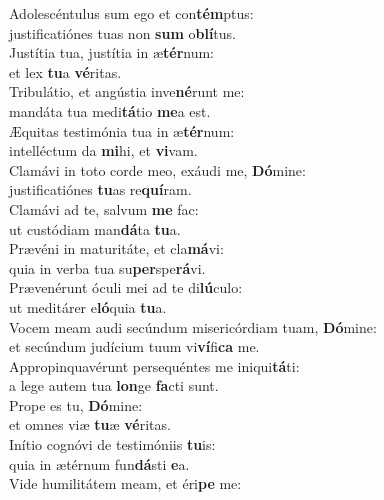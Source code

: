 \oddverse Adolescéntulus sum ego et con\textbf{tém}ptus:~\*\\
\oddverse justificatiónes tuas non \textbf{sum} o\textbf{blí}tus.\\
\evenverse Justítia tua, justítia in æ\textbf{tér}num:~\*\\
\evenverse et lex \textbf{tu}a \textbf{vé}ritas.\\
\oddverse Tribulátio, et angústia inve\textbf{né}runt me:~\*\\
\oddverse mandáta tua medi\textbf{tá}tio \textbf{me}a est.\\
\evenverse Æquitas testimónia tua in æ\textbf{tér}num:~\*\\
\evenverse intelléctum da \textbf{mi}hi, et \textbf{vi}vam.\\
\oddverse Clamávi in toto corde meo, exáudi me, \textbf{Dó}mine:~\*\\
\oddverse justificatiónes \textbf{tu}as re\textbf{quí}ram.\\
\evenverse Clamávi ad te, salvum \textbf{me} fac:~\*\\
\evenverse ut custódiam man\textbf{dá}ta \textbf{tu}a.\\
\oddverse Prævéni in maturitáte, et cla\textbf{má}vi:~\*\\
\oddverse quia in verba tua su\textbf{per}spe\textbf{rá}vi.\\
\evenverse Prævenérunt óculi mei ad te di\textbf{lú}culo:~\*\\
\evenverse ut meditárer e\textbf{ló}quia \textbf{tu}a.\\
\oddverse Vocem meam audi secúndum misericórdiam tuam, \textbf{Dó}mine:~\*\\
\oddverse et secúndum judícium tuum vi\textbf{ví}fi\textbf{ca} me.\\
\evenverse Appropinquavérunt persequéntes me iniqui\textbf{tá}ti:~\*\\
\evenverse a lege autem tua \textbf{lon}ge \textbf{fa}cti sunt.\\
\oddverse Prope es tu, \textbf{Dó}mine:~\*\\
\oddverse et omnes viæ \textbf{tu}æ \textbf{vé}ritas.\\
\evenverse Inítio cognóvi de testimóniis \textbf{tu}is:~\*\\
\evenverse quia in ætérnum fun\textbf{dá}sti \textbf{e}a.\\
\oddverse Vide humilitátem meam, et éri\textbf{pe} me:~\*\\

